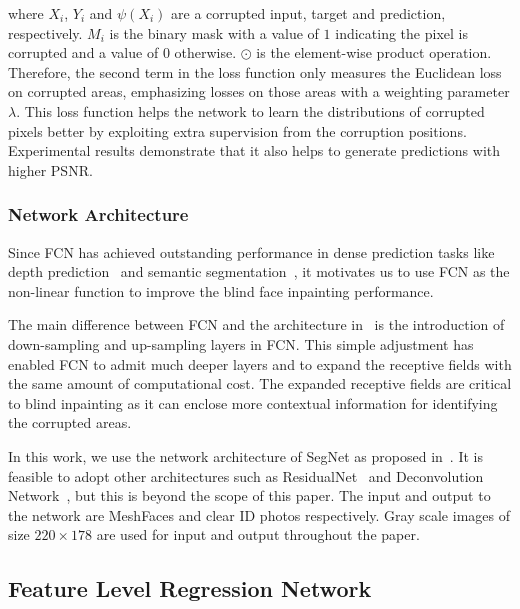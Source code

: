 \documentclass[10pt,twocolumn,letterpaper]{article}
\begin{document}
where $X_i$, $Y_i$ and $\psi ({X_i})$ are a corrupted input, target and prediction, respectively. $M_i$ is the binary mask with a value of $1$ indicating the pixel is corrupted and a value of $0$ otherwise. $\odot$ is the element-wise product operation. Therefore, the second term in the loss function only measures the Euclidean loss on corrupted areas, emphasizing losses on those areas with a weighting parameter $\lambda$. This loss function helps the network to learn the distributions of corrupted pixels better by exploiting extra supervision from the corruption positions. Experimental results demonstrate that it also helps to generate predictions with higher PSNR.


\subsubsection{Network Architecture} Since FCN has achieved outstanding performance in dense prediction tasks like depth prediction~\cite{eigen2014depth} and semantic segmentation~\cite{long2015fully}, it motivates us to use FCN as the non-linear function to improve the blind face inpainting performance.

The main difference between FCN and the architecture in~\cite{7550058} is the introduction of down-sampling and up-sampling layers in FCN. This simple adjustment has enabled FCN to admit much deeper layers and to expand the receptive fields with the same amount of computational cost. The expanded receptive fields are critical to blind inpainting as it can enclose more contextual information for identifying the corrupted areas.


In this work, we use the network architecture of SegNet as proposed in~\cite{badrinarayanan2015segnet}.
 It is feasible to adopt other architectures such as ResidualNet~\cite{He_2016_CVPR} and Deconvolution Network~\cite{Noh_2015_ICCV}, but this is beyond the scope of this paper. The input and output to the network are MeshFaces and clear ID photos respectively. Gray scale images of size $220 \times 178$ are used for input and output throughout the paper.






\subsection{Feature Level Regression Network}
\end{document}
